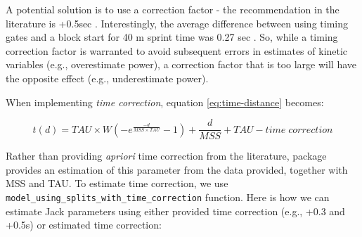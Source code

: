 \documentclass[
]{jss}
\begin{document}
A potential solution is to use a correction factor - the recommendation in the literature is +0.5sec \citep{haugenSprintMechanicalProperties2020, haugenSprintMechanicalVariables2019}. Interestingly, the average difference between using timing gates and a block start for 40 m sprint time was 0.27 sec \citep{haugenDifferenceStartImpact2012}. So, while a timing correction factor is warranted to avoid subsequent errors in estimates of kinetic variables (e.g., overestimate power), a correction factor that is too large will have the opposite effect (e.g., underestimate power).

When implementing \emph{time correction}, equation \eqref{eq:time-distance} becomes:

\begin{equation}
  t(d) = TAU \times W(-e^{\frac{-d}{MSS \times TAU}} - 1) + \frac{d}{MSS} + TAU - time \; correction \label{eq:time-correction}
\end{equation}

Rather than providing \emph{apriori} time correction from the literature,  package provides an estimation of this parameter from the data provided, together with MSS and TAU. To estimate time correction, we use \texttt{model\_using\_splits\_with\_time\_correction} function. Here is how we can estimate Jack parameters using either provided time correction (e.g., +0.3 and +0.5s) or estimated time correction:
\end{document}

